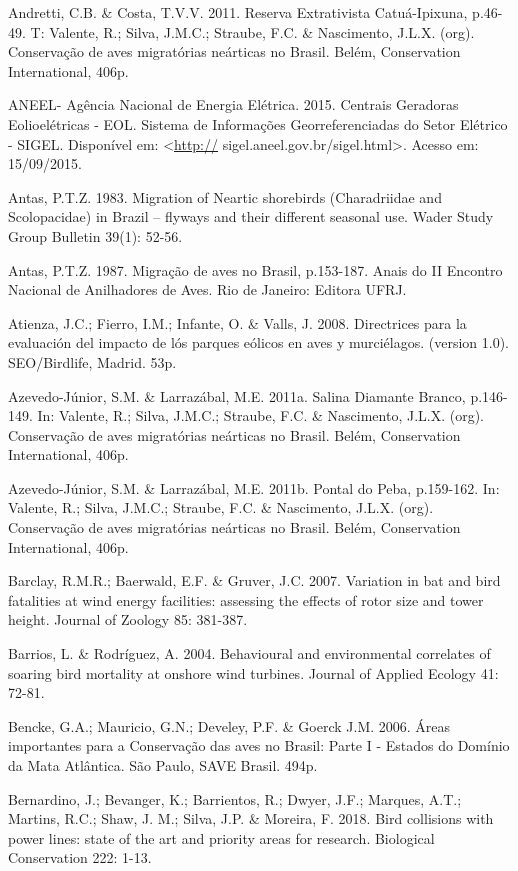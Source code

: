 \documentclass[
  oneside]{scrbook}
\begin{document}
Andretti, C.B. \& Costa, T.V.V. 2011. Reserva Extrativista Catuá-Ipixuna, p.46-49. T: Valente, R.; Silva, J.M.C.; Straube, F.C. \& Nascimento, J.L.X. (org). Conservação de aves migratórias neárticas no Brasil. Belém, Conservation International, 406p.

ANEEL- Agência Nacional de Energia Elétrica. 2015. Centrais Geradoras Eolioelétricas - EOL. Sistema de Informações Georreferenciadas do Setor Elétrico - SIGEL. Disponível em: \textless{}\url{http://} sigel.aneel.gov.br/sigel.html\textgreater. Acesso em: 15/09/2015.

Antas, P.T.Z. 1983. Migration of Neartic shorebirds (Charadriidae and Scolopacidae) in Brazil -- flyways and their different seasonal use. Wader Study Group Bulletin 39(1): 52-56.

Antas, P.T.Z. 1987. Migração de aves no Brasil, p.153-187. Anais do II Encontro Nacional de Anilhadores de Aves. Rio de Janeiro: Editora UFRJ.

Atienza, J.C.; Fierro, I.M.; Infante, O. \& Valls, J. 2008. Directrices para la evaluación del impacto de lós parques eólicos en aves y murciélagos. (version 1.0). SEO/Birdlife, Madrid. 53p.

Azevedo-Júnior, S.M. \& Larrazábal, M.E. 2011a. Salina Diamante Branco, p.146-149. In: Valente, R.; Silva, J.M.C.; Straube, F.C. \& Nascimento, J.L.X. (org). Conservação de aves migratórias neárticas no Brasil. Belém, Conservation International, 406p.

Azevedo-Júnior, S.M. \& Larrazábal, M.E. 2011b. Pontal do Peba, p.159-162. In: Valente, R.; Silva, J.M.C.; Straube, F.C. \& Nascimento, J.L.X. (org). Conservação de aves migratórias neárticas no Brasil. Belém, Conservation International, 406p.

Barclay, R.M.R.; Baerwald, E.F. \& Gruver, J.C. 2007. Variation in bat and bird fatalities at wind energy facilities: assessing the effects of rotor size and tower height. Journal of Zoology 85: 381-387.

Barrios, L. \& Rodríguez, A. 2004. Behavioural and environmental correlates of soaring bird mortality at onshore wind turbines. Journal of Applied Ecology 41: 72-81.

Bencke, G.A.; Mauricio, G.N.; Develey, P.F. \& Goerck J.M. 2006. Áreas importantes para a Conservação das aves no Brasil: Parte I - Estados do Domínio da Mata Atlântica. São Paulo, SAVE Brasil. 494p.

Bernardino, J.; Bevanger, K.; Barrientos, R.; Dwyer, J.F.; Marques, A.T.; Martins, R.C.; Shaw, J. M.; Silva, J.P. \& Moreira, F. 2018. Bird collisions with power lines: state of the art and priority areas for research. Biological Conservation 222: 1-13.
\end{document}
